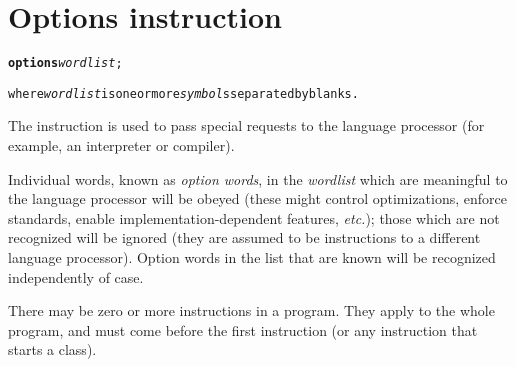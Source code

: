 \section{Options instruction}\label{refoptions}
\begin{shaded}
\begin{alltt}
\textbf{options} \emph{wordlist};

where \emph{wordlist} is one or more \emph{symbol}s separated by blanks.
\end{alltt}
\end{shaded}
 
The  instruction is used to pass special requests to
the language processor (for example, an interpreter or compiler).
 
Individual words, known as \emph{option words}, in the
\emph{wordlist} which are meaningful to the language processor will
be obeyed (these might control optimizations, enforce standards, enable
implementation-dependent features, \emph{etc.}); those which are not
recognized will be ignored (they are assumed to be instructions to a
different language processor).
Option words in the list that are known will be recognized independently
of case.
 
There may be zero or more  instructions in a program.
They apply to the whole program, and must come before the first
 instruction (or any instruction that starts a class).
 
